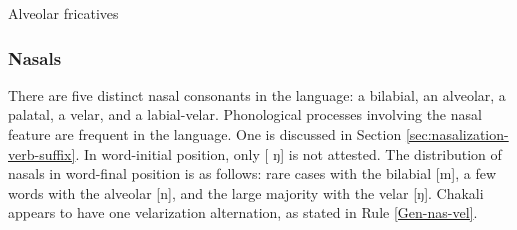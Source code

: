 
\begin{table} 

\caption{Alveolar  fricatives\label{tab:alveolar-fricatives}}

\quad
{}


\end{table}


\subsubsection{Nasals}
\label{sec:PHON-nasal}

There are  five distinct nasal consonants in the language: a bilabial, an 
alveolar, a 
palatal, a velar, and a labial-velar. Phonological processes involving the 
nasal feature are frequent in the language. One is discussed in Section 
\ref{sec:nasalization-verb-suffix}.  In word-initial position,  only  [{
ŋ}] 
is not attested. The distribution of nasals in word-final position is as 
follows:  rare cases with the bilabial [{m}], a few words with the 
alveolar [{n}], and the large majority with the velar [{ŋ}]. Chakali appears to have one velarization alternation, as stated in Rule \ref{Gen-nas-vel}.


